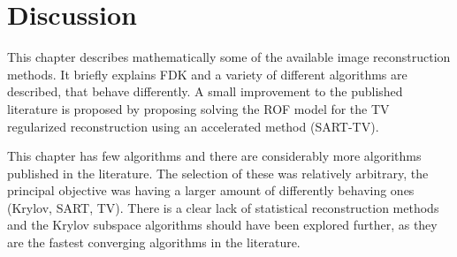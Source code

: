 \section{Discussion}

This chapter describes mathematically some of the available image reconstruction methods. It briefly explains FDK and a variety of different algorithms are described, that behave differently. A small improvement to the published literature is proposed by proposing solving the ROF model for the TV regularized reconstruction using an accelerated method (SART-TV).

This chapter has few algorithms and there are considerably more algorithms published in the literature. The selection of these was relatively arbitrary,  the principal objective was having a larger amount of differently behaving ones (Krylov, SART, TV). There is a clear lack of statistical reconstruction methods and the Krylov subspace algorithms should have been explored further, as they are the fastest converging algorithms in the literature.
